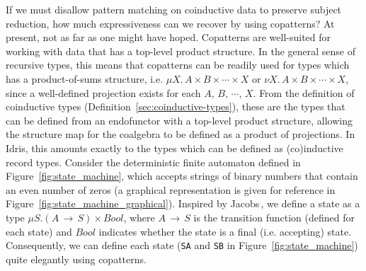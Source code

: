 

\label{sec:prod-vs.-copr}
If we must disallow pattern matching on coinductive data to preserve subject
reduction, how much expressiveness can we recover by using copatterns? At
present, not as far as one might have hoped. Copatterns are well-suited for
working with data that has a top-level product structure. In the general sense
of recursive types, this means that copatterns can be readily used for types
which has a product-of-sums structure, i.e.
${\mu X.\,A\times B\times\cdots\times X}$ or
${\nu X.\,A\times B\times\cdots\times X}$, since a well-defined projection
exists for each $A,\,B,\,\cdots,\,X$. From the definition of coinductive types
(Definition~\ref{sec:coinductive-types}), these are the types that can be
defined from an endofunctor with a top-level product structure, allowing the
structure map for the coalgebra to be defined as a product of projections. In
Idris, this amounts exactly to the types which can be defined as (co)inductive
record types. Consider the deterministic finite automaton defined in
Figure~\ref{fig:state_machine}, which accepts strings of binary numbers that
contain an even number of zeros (a graphical representation is given for
reference in Figure~\ref{fig:state_machine_graphical}). Inspired by
Jacobs\,\citep{JacobsCoalgebra}, we define a state as a type
${\mu S. (A\,\to\,S)\times Bool}$, where $A\,\to\,S$ is the transition function
(defined for each state) and $Bool$ indicates whether the state is a final
(i.e. accepting) state. Consequently, we can define each state (\texttt{SA} and
\texttt{SB} in Figure~\ref{fig:state_machine}) quite elegantly using copatterns.

